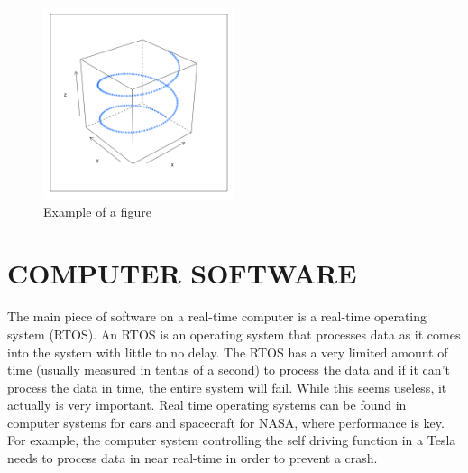 \documentclass[letterpaper, 10 pt, conference]{IEEEconf}
\begin{document}

\begin{figure}[h!]
\centering
\includegraphics[width=0.5\textwidth]{spiral.png}
\caption{Example of a figure}
\label{fig:example}
\end{figure} 

\section{COMPUTER SOFTWARE}

The main piece of software on a real-time computer is a real-time operating system (RTOS). An RTOS is an operating system
that processes data as it comes into the system with little to no delay. The RTOS has a very limited amount of time (usually
measured in tenths of a second) to process the data and if it can't process the data in time, the entire system will fail. While this seems useless, it actually
is very important. Real time operating systems can be found in computer systems for cars and spacecraft for NASA, where performance
is key. For example, the computer system controlling the self driving function in a Tesla needs to process data in near real-time 
in order to prevent a crash.
\end{document}
